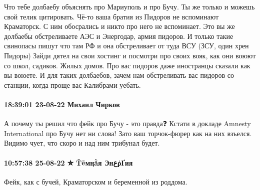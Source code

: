 Что тебе долбаебу объяснять про Мариуполь и про Бучу. Ты же только и можешь
свой телик цитировать. Чё-то ваша братия из Пидоров не вспоминают Краматорск. С
ним обосрались и никто про него не вспоминает. Это вы же долбаебы обстреливаете
АЭС и Энергодар, армия пидоров. И только такие свинопасы пишут что там РФ и она
обстреливает от туда ВСУ (ЗСУ, один хрен Пидоры) Зайди дятел на свои хостинг и
посмотри про своих вояк, как они воюют со школ, садиков. Жилых домов. Про вас
пидоров даже иностранцы сказали как вы воюете. И для таких долбаебов, зачем нам
обстреливать вас пидоров со станции, когда проще вас Калибрами уебать.

\paragraph{18:39:01 23-08-22 Михаил Чирков}

А почему ты решил что фейк про Бучу - это правда❓
Кстати в докладе Amnesty International про Бучу нет ни слова!
Зато ваш торчок-фюрер как на них взъелся. Видимо чует, что скоро и над ним трибунал будет.

\paragraph{10:57:38 25-08-22 ✮ Ťẽмңằя ЭнعῥҐия}

Фейк, как с бучей, Краматорском и беременной из роддома.

